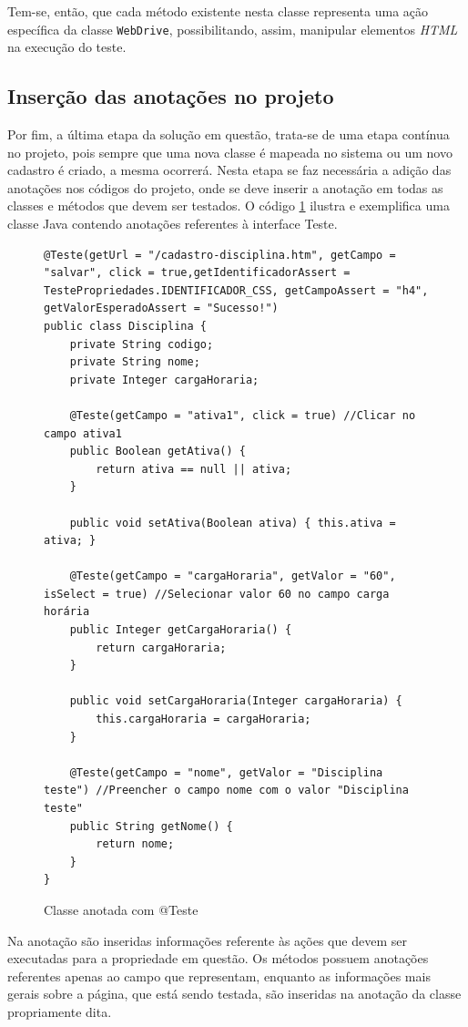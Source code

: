 \documentclass[tg]{mdtufsm}
\begin{document}
Tem-se, então, que cada método existente nesta classe representa uma ação específica da classe \texttt{WebDrive}, possibilitando, assim, manipular elementos \emph{HTML} na execução do teste.

\subsection{Inserção das anotações no projeto}
Por fim, a última etapa da solução em questão, trata-se de uma etapa contínua no projeto, pois sempre que uma nova classe é mapeada no sistema ou um novo cadastro é criado, a mesma ocorrerá. Nesta etapa se faz necessária a
adição das anotações nos códigos do projeto, onde se deve inserir a anotação em todas as classes e métodos que devem ser testados.
O código \ref{code:Disciplina.java} ilustra e exemplifica uma classe Java contendo anotações referentes à interface Teste.

\begin{figure}[!htt]
\begin{lstlisting}
@Teste(getUrl = "/cadastro-disciplina.htm", getCampo = "salvar", click = true,getIdentificadorAssert = TestePropriedades.IDENTIFICADOR_CSS, getCampoAssert = "h4", getValorEsperadoAssert = "Sucesso!")
public class Disciplina {
    private String codigo;
    private String nome;
    private Integer cargaHoraria;

    @Teste(getCampo = "ativa1", click = true) //Clicar no campo ativa1
    public Boolean getAtiva() {
        return ativa == null || ativa;
    }

    public void setAtiva(Boolean ativa) { this.ativa = ativa; }

    @Teste(getCampo = "cargaHoraria", getValor = "60", isSelect = true) //Selecionar valor 60 no campo carga horária
    public Integer getCargaHoraria() {
        return cargaHoraria;
    }

    public void setCargaHoraria(Integer cargaHoraria) {
        this.cargaHoraria = cargaHoraria;
    }

    @Teste(getCampo = "nome", getValor = "Disciplina teste") //Preencher o campo nome com o valor "Disciplina teste"
    public String getNome() {
        return nome;
    }
}
\end{lstlisting}
	\caption{Classe anotada com @Teste}
	\label{code:Disciplina.java}
\end{figure}

Na anotação são inseridas informações referente às ações que devem ser executadas para a propriedade em questão. Os métodos possuem anotações referentes apenas ao campo que representam, enquanto as informações mais gerais sobre
a página, que está sendo testada, são inseridas na anotação da classe propriamente dita.
\end{document}
